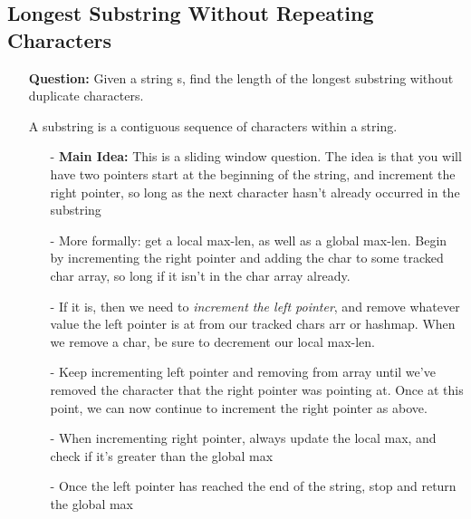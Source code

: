 \documentclass[12pt]{article}
\begin{document}
\subsection{Longest Substring Without Repeating Characters}
\begin{enumerate}
  \item[] \textbf{Question:} Given a string s, find the length of the longest substring without duplicate characters.

A substring is a contiguous sequence of characters within a string.

    \begin{enumerate}
      \item[-] \textbf{Main Idea: } This is a sliding window question. The idea is that you will have two pointers start at the beginning of the string, and increment the right pointer, so long as the next character hasn't already occurred in the substring
      \item[-] More formally: get a local max-len, as well as a global max-len. Begin by incrementing the right pointer and adding the char to some tracked char array, so long if it isn't in the char array already. 
      \item[-] If it is, then we need to \textit{increment the left pointer}, and remove whatever value the left pointer is at from our tracked chars arr or hashmap. When we remove a char, be sure to decrement our local max-len.
      \item[-] Keep incrementing left pointer and removing from array until we've removed the character that the right pointer was pointing at. Once at this point, we can now continue to increment the right pointer as above. 
      \item[-] When incrementing right pointer, always update the local max, and check if it's greater than the global max
      \item[-] Once the left pointer has reached the end of the string, stop and return the global max
    \end{enumerate}
\end{enumerate}
\end{document}
